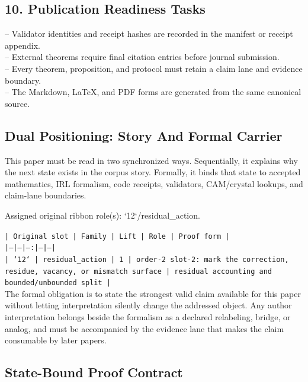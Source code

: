 \documentclass[11pt]{article}
\begin{document}
\subsection*{10. Publication Readiness Tasks}

\noindent{}-- Validator identities and receipt hashes are recorded in the manifest or receipt appendix.\\
\noindent{}-- External theorems require final citation entries before journal submission.\\
\noindent{}-- Every theorem, proposition, and protocol must retain a claim lane and evidence boundary.\\
\noindent{}-- The Markdown, LaTeX, and PDF forms are generated from the same canonical source.\\

\subsection*{Dual Positioning: Story And Formal Carrier}

This paper must be read in two synchronized ways. Sequentially, it explains why
the next state exists in the corpus story. Formally, it binds that state to
accepted mathematics, IRL formalism, code receipts, validators, CAM/crystal
lookups, and claim-lane boundaries.

Assigned original ribbon role(s): `12`/residual\_action.

\noindent\texttt{| Original slot | Family | Lift | Role | Proof form |}\\
\noindent\texttt{|---|---|---:|---|---|}\\
\noindent\texttt{| `12` | residual\_action | 1 | order-2 slot-2: mark the correction, residue, vacancy, or mismatch surface | residual accounting and bounded/unbounded split |}\\

The formal obligation is to state the strongest valid claim available for this
paper without letting interpretation silently change the addressed object. Any
author interpretation belongs beside the formalism as a declared relabeling,
bridge, or analog, and must be accompanied by the evidence lane that makes the
claim consumable by later papers.

\subsection*{State-Bound Proof Contract}
\end{document}
